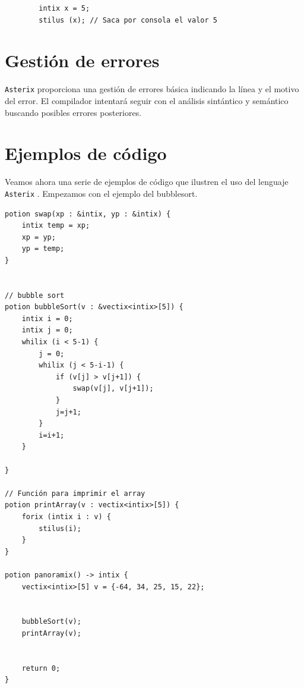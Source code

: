 \documentclass[a4paper, 9pt]{article}
\newcommand{\atx}{\texttt{Asterix} }
\begin{document}
    \begin{verbatim}
        intix x = 5;
        stilus (x); // Saca por consola el valor 5
    \end{verbatim}

    \section*{Gestión de errores}
    \atx proporciona una gestión de errores básica indicando la línea y el motivo
    del error. El compilador intentará seguir con el análisis sintántico y semántico
    buscando posibles errores posteriores.

    \section*{Ejemplos de código}
    Veamos ahora una serie de ejemplos de código que ilustren el uso del lenguaje
    \atx. Empezamos con el ejemplo del bubblesort.
    
    \begin{verbatim}
potion swap(xp : &intix, yp : &intix) {
    intix temp = xp;
    xp = yp;
    yp = temp;
}


// bubble sort
potion bubbleSort(v : &vectix<intix>[5]) {
    intix i = 0;
    intix j = 0;
    whilix (i < 5-1) {
        j = 0;
        whilix (j < 5-i-1) {
            if (v[j] > v[j+1]) {
                swap(v[j], v[j+1]);
            }
            j=j+1;
        }
        i=i+1;
    }

}

// Función para imprimir el array
potion printArray(v : vectix<intix>[5]) {
    forix (intix i : v) {
        stilus(i);
    }
}

potion panoramix() -> intix {
    vectix<intix>[5] v = {-64, 34, 25, 15, 22};


    bubbleSort(v);
    printArray(v);


    return 0;
}
    \end{verbatim}
    
\end{document}
